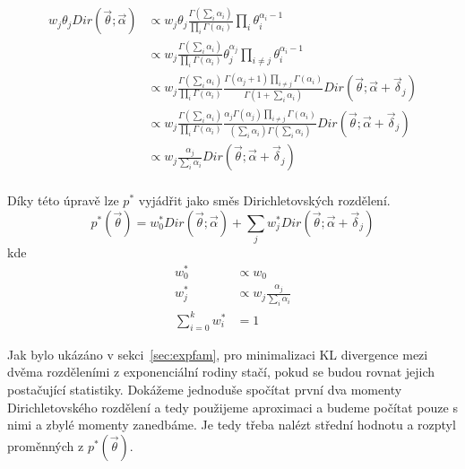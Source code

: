 \begin{align}
w_j \theta_j Dir(\vec{\theta}; \vec{\alpha}) &\propto
    w_j \theta_j \frac{\Gamma (\sum_i \alpha_{i})}{\prod_i \Gamma(\alpha_i)}
    \prod_i \theta_{i}^{\alpha_{i} - 1}
\label{eq:4}
\\
&\propto w_j \frac{\Gamma (\sum_i \alpha_{i})} {\prod_i
    \Gamma(\alpha_{i})} \theta_j^{\alpha_j} \prod_{i \ne j}
    \theta_{i}^{\alpha_{i} - 1} \\
&\propto w_j
    \frac{\Gamma (\sum_i \alpha_{i})}
         {\prod_i \Gamma(\alpha_{i})}
    \frac{\Gamma(\alpha_{j} + 1) \prod_{i \ne j} \Gamma(\alpha_i)}
         {\Gamma (1 + \sum_i \alpha_i)}
    Dir(\vec\theta; \vec{\alpha} + \vec{\delta}_j) \\
&\propto w_j
    \frac{\Gamma (\sum_i \alpha_{i})}
         {\prod_i \Gamma(\alpha_{i})}
    \frac{\alpha_j \Gamma(\alpha_j) \prod_{i \ne j} \Gamma(\alpha_i)}
         {(\sum_i \alpha_i) \Gamma (\sum_i \alpha_i)}
    Dir(\vec\theta; \vec{\alpha} + \vec{\delta}_j) \\
&\propto w_j
    \frac{\alpha_j}
         {\sum_i \alpha_i}
    Dir(\vec\theta; \vec{\alpha} + \vec{\delta}_j) \\
\end{align}

Díky této úpravě lze $p^*$ vyjádřit jako směs Dirichletovských rozdělení.
\begin{equation}
p^*(\vec{\theta}) =
    w_0^* Dir(\vec{\theta}; \vec{\alpha}) +
    \sum_j w^*_j
        Dir(\vec{\theta}; \vec{\alpha} + \vec{\delta}_j)
\label{eq:marginaltheta}
\end{equation}
kde
\begin{align}
    w^*_0 &\propto w_0 \\
    w^*_j &\propto w_j \frac{\alpha_j}{\sum_i \alpha_i} \\
    \sum_{i=0}^k w_i^* &= 1
\end{align}

Jak bylo ukázáno v sekci~\ref{sec:expfam}, pro minimalizaci KL divergence mezi dvěma rozděleními z exponenciální rodiny
stačí, pokud se budou rovnat jejich postačující statistiky. Dokážeme jednoduše
spočítat první dva momenty Dirichletovského rozdělení a tedy použijeme
aproximaci a budeme počítat pouze s nimi a zbylé momenty zanedbáme.
Je tedy třeba nalézt střední hodnotu a rozptyl proměnných z $p^*(\vec\theta)$.


